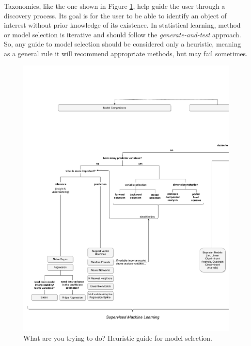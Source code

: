 Taxonomies, like the one shown in Figure \ref{fig:modelsel}, help guide the user through a discovery process. Its goal is for the user to be able to identify an object of interest without prior knowledge of its existence. In statistical learning, method or model selection is iterative and should follow the \textit{generate-and-test} approach. So, any guide to model selection should be considered only a heuristic, meaning as a general rule it will recommend appropriate methods, but may fail sometimes. 

%
%


\begin{figure}
	\centering
	\includegraphics[width=\linewidth,trim={0 0.5in 0 0.8in},clip=true, page=1]{plots/ch1_statsflowchart.pdf}
	\caption{What are you trying to do? Heuristic guide for model selection.} 
	\label{fig:modelsel}
\end{figure}

